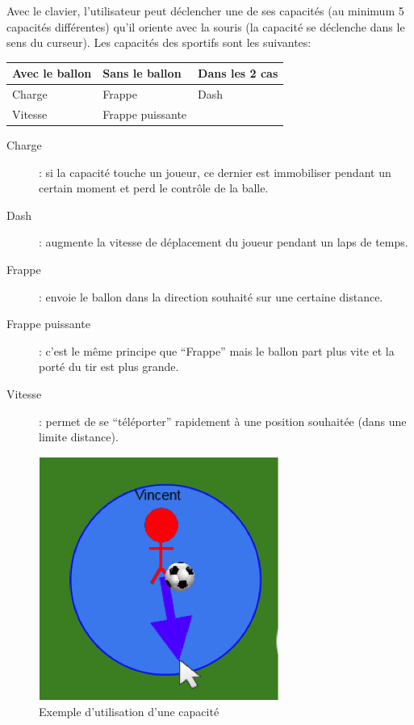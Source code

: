Avec le clavier, l'utilisateur peut déclencher une de ses capacités (au minimum 5 capacités différentes) qu’il oriente avec la souris (la capacité se déclenche dans le sens du curseur). Les capacités des sportifs sont les suivantes:\\

\begin{tabular}{|l|l|l|}
\hline
  Avec le ballon & Sans le ballon & Dans les 2 cas \\
\hline
  Charge & Frappe & Dash \\
  Vitesse & Frappe puissante  &  \\

\hline 
\end{tabular}

\vspace{.05in}
\begin{description}
  \item[Charge]: si la capacité touche un joueur, ce dernier est immobiliser pendant un certain moment et perd le contrôle de la balle.
  \item[Dash]: augmente la vitesse de déplacement du joueur pendant un laps de temps.
  \item[Frappe]: envoie le ballon dans la direction souhaité sur une certaine distance.
  \item[Frappe puissante]: c’est le même principe que “Frappe” mais le ballon part plus vite et la porté du tir est plus grande.
  \item[Vitesse]: permet de se “téléporter” rapidement à une position souhaitée (dans une limite distance).
\end{description}
\vspace{.05in}
\begin{figure}[h!]
\centering
\includegraphics[scale=1]{fig1.png}
\caption{Exemple d'utilisation d'une capacité}
\end{figure}

